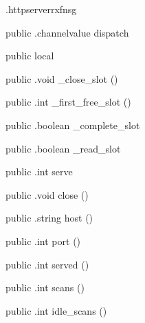 \begin{CrexxClass}{.httpserver}{rxfnsg}
\begin{Members}
    \Method
      {public}
      {.channelvalue}
      {dispatch}
      {}

    \Factory
      {public}
      {local}
      {}

    \Method
      {public}
      {.void}
      {\_close\_slot}
      {()}

    \Method
      {public}
      {.int}
      {\_first\_free\_slot}
      {()}

    \Method
      {public}
      {.boolean}
      {\_complete\_slot}
      {}

    \Method
      {public}
      {.boolean}
      {\_read\_slot}
      {}

    \Method
      {public}
      {.int}
      {serve}
      {}

    \Method
      {public}
      {.void}
      {close}
      {()}

    \Method
      {public}
      {.string}
      {host}
      {()}

    \Method
      {public}
      {.int}
      {port}
      {()}

    \Method
      {public}
      {.int}
      {served}
      {()}

    \Method
      {public}
      {.int}
      {scans}
      {()}

    \Method
      {public}
      {.int}
      {idle\_scans}
      {()}

  \end{Members}
\end{CrexxClass}

